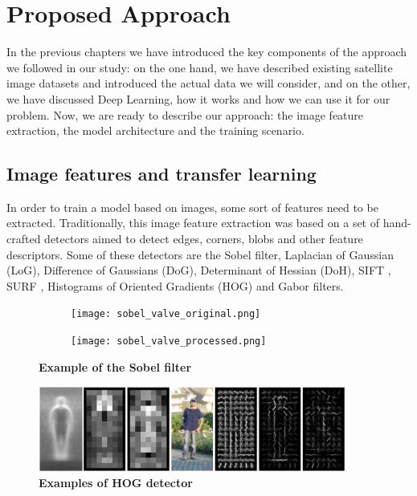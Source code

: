 
\chapter{Proposed Approach}

\label{Chapter4}


In the previous chapters we have introduced the key components of the approach we followed in our study: on the one hand, we have described existing satellite image datasets and introduced the actual data we will consider, and on the other, we have discussed Deep Learning, how it works and how we can use it for our problem. Now, we are ready to describe our approach: the image feature extraction, the model architecture and the training scenario.

\section{Image features and transfer learning}\label{sec:transferLearning}

In order to train a model based on images, some sort of features need to be extracted. Traditionally, this image feature extraction was based on a set of hand-crafted detectors aimed to detect edges, corners, blobs and other feature descriptors. Some of these detectors are the Sobel filter, Laplacian of Gaussian (LoG), Difference of Gaussians (DoG), Determinant of Hessian (DoH), SIFT \parencite{Lowe1999,Lowe2004}, SURF \parencite{Bay2006}, Histograms of Oriented Gradients (HOG) \parencite{Dalal2005} and Gabor filters.

\begin{figure}[h!]
	\centering
	\begin{subfigure}{.5\textwidth}
  		\centering
  		\texttt{[image: sobel\_valve\_original.png]}
	\end{subfigure}%
	\begin{subfigure}{.5\textwidth}
  		\centering
  		\texttt{[image: sobel\_valve\_processed.png]}
	\end{subfigure}
	\captionsetup{width=1\linewidth}
	\caption{\textbf{Example of the Sobel filter}}
	\label{fig:sobel}
\end{figure}

\begin{figure}[h!]
	\centering
	\includegraphics[width=0.9\textwidth]{Figures/hog_example.png}
	\captionsetup{width=1\linewidth}
	\caption{\textbf{Examples of HOG detector \parencite{Dalal2005}}}
	\label{fig:hog}
\end{figure}

